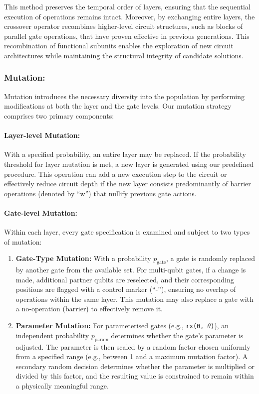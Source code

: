 \documentclass[11pt,a4paper]{article}
\begin{document}
This method preserves the temporal order of layers, ensuring that the sequential execution of operations remains intact. Moreover, by exchanging entire layers, the crossover operator recombines higher-level circuit structures, such as blocks of parallel gate operations, that have proven effective in previous generations. This recombination of functional subunits enables the exploration of new circuit architectures while maintaining the structural integrity of candidate solutions.

\subsubsection*{Mutation:}
Mutation introduces the necessary diversity into the population by performing modifications at both the layer and the gate levels. Our mutation strategy comprises two primary components:

\paragraph*{Layer-level Mutation:\newline}
With a specified probability, an entire layer may be replaced. If the probability threshold for layer mutation is met, a new layer is generated using our predefined procedure. This operation can add a new execution step to the circuit or effectively reduce circuit depth if the new layer consists predominantly of barrier operations (denoted by ``w'') that nullify previous gate actions.

\paragraph*{Gate-level Mutation:\newline}
Within each layer, every gate specification is examined and subject to two types of mutation:
\begin{enumerate}
    \item \textbf{Gate-Type Mutation:} With a probability $p_{\text{gate}}$, a gate is randomly replaced by another gate from the available set. For multi-qubit gates, if a change is made, additional partner qubits are reselected, and their corresponding positions are flagged with a control marker (``-''), ensuring no overlap of operations within the same layer. This mutation may also replace a gate with a no-operation (barrier) to effectively remove it.
    \item \textbf{Parameter Mutation:} For parameterised gates (e.g., \texttt{rx(0, $\theta$)}), an independent probability $p_{\text{param}}$ determines whether the gate’s parameter is adjusted. The parameter is then scaled by a random factor chosen uniformly from a specified range (e.g., between 1 and a maximum mutation factor). A secondary random decision determines whether the parameter is multiplied or divided by this factor, and the resulting value is constrained to remain within a physically meaningful range.
\end{enumerate}
\end{document}
